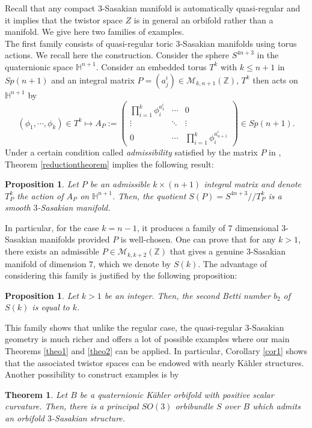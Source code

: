 \documentclass[12pt, reqno]{amsart}
\newtheorem{theo}[Def]{Theorem}
\newtheorem{prop}[Def]{Proposition}
\theoremstyle{definition}
\newcommand{\Hq}{\mathbb{H}}
\newcommand{\Z}{\mathbb{Z}}
\begin{document}
Recall that any compact $3$-Sasakian manifold is automatically quasi-regular and it implies that the twistor space $Z$ is in general an orbifold rather than a manifold. We give here two families of examples. \\
\indent The first family consists of quasi-regular toric $3$-Sasakian manifolds using torus actions. We recall here the construction. Consider the sphere $S^{4n+3}$ in the quaternionic space $\Hq^{n+1}.$ Consider an embedded torus $T^k$ with $k\leq n+1$ in $Sp(n+1)$ and an integral matrix $P=(a^i_j)\in\mathcal{M}_{k,n+1}(\Z)$, $T^k$ then acts on $\Hq^{n+1}$ by  $$(\phi_1,\cdots,\phi_k)\in T^k\mapsto A_P:=\begin{pmatrix}
    \prod_{i=1}^k\phi_i^{a^i_1}&\cdots&0\\
    \vdots&\ddots&\vdots\\
    0&\cdots&\prod_{i=1}^k\phi_i^{a^i_{n+1}}
\end{pmatrix}\in Sp(n+1).$$ Under a certain condition called \textit{admissibility} satisfied by the matrix $P$ in \cite[Definition 7.1.7]{Boyer:1998sf}, Theorem \ref{reductiontheorem} implies the following result:
\begin{prop}\cite[Theorem 6.3.1, 7.1.2]{Boyer:1998sf}
    Let $P$ be an admissible $k\times (n+1)$ integral matrix and denote $T^k_P$ the action of $A_P$ on $\Hq^{n+1}$. Then, the quotient $S(P)=S^{4n+3}/\!\!/T^k_P$ is a smooth $3$-Sasakian manifold.
 \end{prop}
 In particular, for the case $k=n-1$, it produces a family of $7$ dimensional $3$-Sasakian manifolds provided $P$ is well-chosen. One can prove that for any $k>1$, there exists an admissible $P\in\mathcal{M}_{k,k+2}(\Z)$ that gives a genuine $3$-Sasakian manifold of dimension $7$, which we denote by $S(k)$. The advantage of considering this family is justified by the following proposition: 
 \begin{prop}\cite[Proposition 7.5.11]{Boyer:1998sf} Let $k>1$ be an integer. Then, the second Betti number $b_2$ of $S(k)$ is equal to $k$. 
\end{prop}
This family shows that unlike the regular case, the quasi-regular $3$-Sasakian geometry is much richer and offers a lot of possible examples where our main Theorems \ref{theo1} and \ref{theo2} can be applied. In particular, Corollary \ref{cor1} shows that the associated twistor spaces can be endowed with nearly Kähler structures. \\ 
\indent Another possibility to construct examples is by 
\begin{theo}\cite[Theorem 2.3.5]{Boyer:1998sf} Let $B$ be a quaternionic Kähler orbifold with positive scalar curvature. Then, there is a principal $SO(3)$ orbibundle $S$ over $B$ which admits an orbifold $3$-Sasakian structure.
\end{theo}
\end{document}
